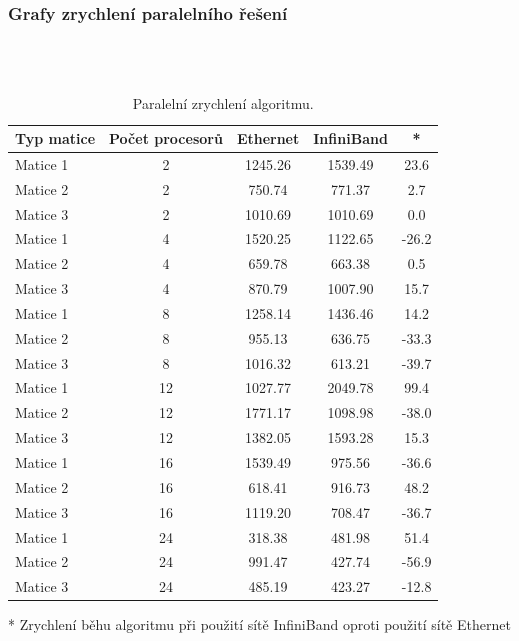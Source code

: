 \documentclass[12pt]{article}
\begin{document}
\subsubsection{Grafy zrychlení paralelního řešení}

\\

\\


\begin{table}[ht]
\centering
\begin{tabular}{|l|c|c|c|c|}
\hline \textbf{Typ matice} & \textbf{Počet procesorů} & \textbf{Ethernet} & \textbf{InfiniBand} & * \\
\hline 
\hline Matice 1 & 2 & 1245.26 & 1539.49 & 23.6 \\ 
\hline Matice 2 & 2 & 750.74 & 771.37 & 2.7 \\ 
\hline Matice 3 & 2 & 1010.69 & 1010.69 & 0.0 \\ 
\hline
\hline Matice 1 & 4 & 1520.25 & 1122.65 & -26.2 \\ 
\hline Matice 2 & 4 & 659.78 & 663.38 & 0.5 \\ 
\hline Matice 3 & 4 & 870.79 & 1007.90 & 15.7 \\ 
\hline 
\hline Matice 1 & 8 & 1258.14 & 1436.46 & 14.2 \\ 
\hline Matice 2 & 8 & 955.13 & 636.75 & -33.3 \\ 
\hline Matice 3 & 8 & 1016.32 & 613.21 & -39.7 \\ 
\hline 
\hline Matice 1 & 12 & 1027.77 & 2049.78 & 99.4 \\ 
\hline Matice 2 & 12 & 1771.17 & 1098.98 & -38.0 \\ 
\hline Matice 3 & 12 & 1382.05 & 1593.28 & 15.3 \\ 
\hline 
\hline Matice 1 & 16 & 1539.49 & 975.56 & -36.6 \\ 
\hline Matice 2 & 16 & 618.41 & 916.73 & 48.2 \\ 
\hline Matice 3 & 16 & 1119.20 & 708.47 & -36.7 \\ 
\hline 
\hline Matice 1 & 24 & 318.38 & 481.98 & 51.4 \\ 
\hline Matice 2 & 24 & 991.47 & 427.74 & -56.9 \\ 
\hline Matice 3 & 24 & 485.19 & 423.27 & -12.8 \\ 
\hline 
\end{tabular}
\caption{Paralelní zrychlení algoritmu.}
\label{paralelni_zrychleni}
\end{table}
* Zrychlení běhu algoritmu při použití sítě InfiniBand oproti použití sítě Ethernet
\\
\end{document}

